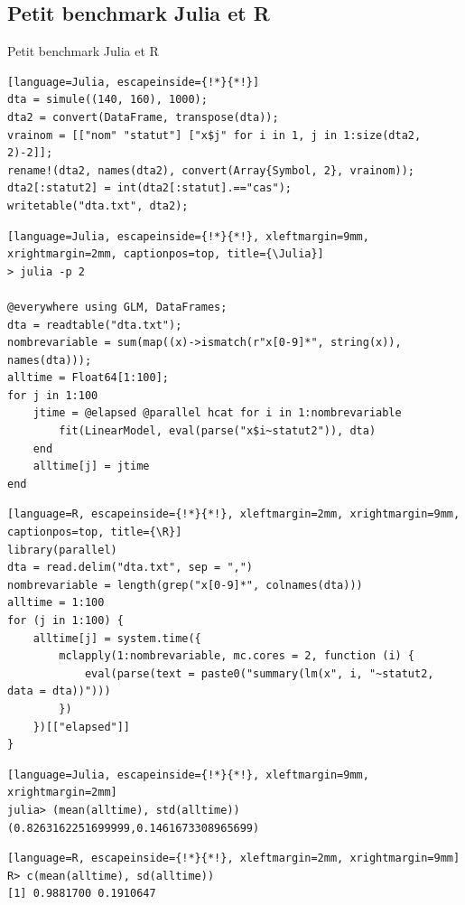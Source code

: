 \subsection{Petit benchmark Julia et R}
\begin{frame}[containsverbatim]{Petit benchmark Julia et R}
\begin{lstlisting}[language=Julia, escapeinside={!*}{*!}]
dta = simule((140, 160), 1000);
dta2 = convert(DataFrame, transpose(dta));
vrainom = [["nom" "statut"] ["x$j" for i in 1, j in 1:size(dta2, 2)-2]];
rename!(dta2, names(dta2), convert(Array{Symbol, 2}, vrainom));
dta2[:statut2] = int(dta2[:statut].=="cas");
writetable("dta.txt", dta2);
\end{lstlisting}
\vspace{-3ex}
\begin{multicols}{2}
\begin{lstlisting}[language=Julia, escapeinside={!*}{*!}, xleftmargin=9mm, xrightmargin=2mm, captionpos=top, title={\Julia}]
> julia -p 2

@everywhere using GLM, DataFrames;
dta = readtable("dta.txt");
nombrevariable = sum(map((x)->ismatch(r"x[0-9]*", string(x)), names(dta)));
alltime = Float64[1:100];
for j in 1:100
    jtime = @elapsed @parallel hcat for i in 1:nombrevariable
        fit(LinearModel, eval(parse("x$i~statut2")), dta)
    end
    alltime[j] = jtime
end
\end{lstlisting}
\columnbreak
\begin{lstlisting}[language=R, escapeinside={!*}{*!}, xleftmargin=2mm, xrightmargin=9mm, captionpos=top, title={\R}]
library(parallel)
dta = read.delim("dta.txt", sep = ",")
nombrevariable = length(grep("x[0-9]*", colnames(dta)))
alltime = 1:100
for (j in 1:100) {
    alltime[j] = system.time({
        mclapply(1:nombrevariable, mc.cores = 2, function (i) {
            eval(parse(text = paste0("summary(lm(x", i, "~statut2, data = dta))")))
        })
    })[["elapsed"]]
}
\end{lstlisting}
\end{multicols}
\vspace{-6ex}
\begin{multicols}{2}
\begin{lstlisting}[language=Julia, escapeinside={!*}{*!}, xleftmargin=9mm, xrightmargin=2mm]
julia> (mean(alltime), std(alltime))
(0.8263162251699999,0.1461673308965699)
\end{lstlisting}
\columnbreak
\begin{lstlisting}[language=R, escapeinside={!*}{*!}, xleftmargin=2mm, xrightmargin=9mm]
R> c(mean(alltime), sd(alltime))
[1] 0.9881700 0.1910647
\end{lstlisting}
\end{multicols}
\end{frame}


